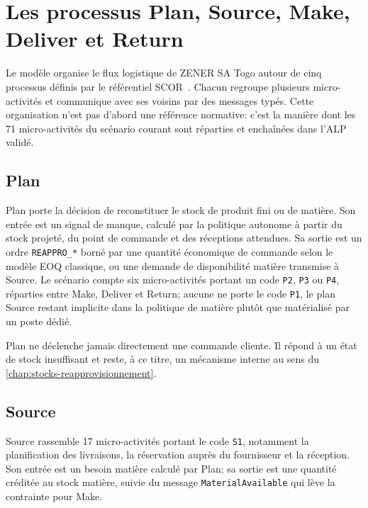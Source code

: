\chapter{Les processus Plan, Source, Make, Deliver et Return}
\label{chap:processus-scor}

Le modèle organise le flux logistique de ZENER SA Togo autour de cinq processus définis par le référentiel SCOR~\cite{apics2017}. Chacun regroupe plusieurs micro-activités et communique avec ses voisins par des messages typés. Cette organisation n'est pas d'abord une référence normative: c'est la manière dont les 71 micro-activités du scénario courant sont réparties et enchaînées dans l'ALP validé.


\section{Plan}

Plan porte la décision de reconstituer le stock de produit fini ou de matière. Son entrée est un signal de manque, calculé par la politique autonome à partir du stock projeté, du point de commande et des réceptions attendues. Sa sortie est un ordre \texttt{REAPPRO\_*} borné par une quantité économique de commande selon le modèle EOQ classique, ou une demande de disponibilité matière transmise à Source. Le scénario compte six micro-activités portant un code \texttt{P2}, \texttt{P3} ou \texttt{P4}, réparties entre Make, Deliver et Return; aucune ne porte le code \texttt{P1}, le plan Source restant implicite dans la politique de matière plutôt que matérialisé par un poste dédié.

Plan ne déclenche jamais directement une commande cliente. Il répond à un état de stock insuffisant et reste, à ce titre, un mécanisme interne au sens du \cref{chap:stocks-reapprovisionnement}.

\section{Source}

Source rassemble 17 micro-activités portant le code \texttt{S1}, notamment la planification des livraisons, la réservation auprès du fournisseur et la réception. Son entrée est un besoin matière calculé par Plan; sa sortie est une quantité créditée au stock matière, suivie du message \texttt{MaterialAvailable} qui lève la contrainte pour Make.


